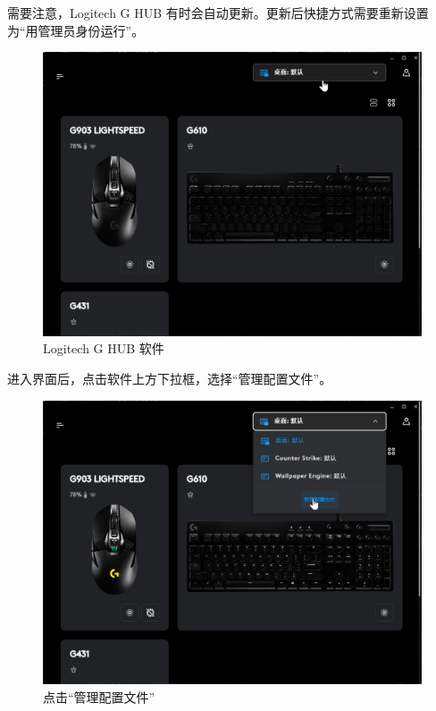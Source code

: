 需要注意，Logitech G HUB 有时会自动更新。更新后快捷方式需要重新设置为“用管理员身份运行”。

\begin{figure}[H]
    \Centering
    \includegraphics[width=\textwidth]{docs/assets/lghub.png}
    \caption{Logitech G HUB 软件}
\end{figure}

进入界面后，点击软件上方下拉框，选择“管理配置文件”。

\begin{figure}[H]
    \Centering
    \includegraphics[width=\textwidth]{docs/assets/manage_configs.png}
    \caption{点击“管理配置文件”}
\end{figure}

